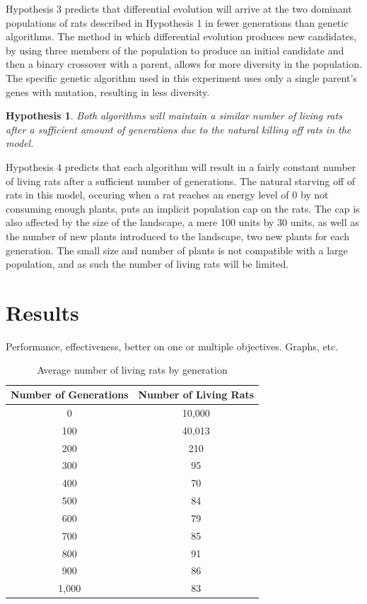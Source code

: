 \documentclass{sig-alternate}
\newtheorem{hyp}{Hypothesis}
\begin{document}
Hypothesis 3 predicts that differential evolution will arrive at the two dominant populations of rats described in Hypothesis 1 in fewer generations than genetic algorithms.  The method in which differential evolution produces new candidates, by using three members of the population to produce an initial candidate and then a binary crossover with a parent, allows for more diversity in the population.  The specific genetic algorithm used in this experiment uses only a single parent's genes with mutation, resulting in less diversity.

\begin{hyp}
\begin{minipage}[t]{2.2 in}
Both algorithms will maintain a similar number of living rats after a sufficient amount of generations due to the natural killing off rats in the model.
\end{minipage}
\end{hyp}

Hypothesis 4 predicts that each algorithm will result in a fairly constant number of living rats after a sufficient number of generations.  The natural starving off of rats in this model, occuring when a rat reaches an energy level of 0 by not consuming enough plants, puts an implicit population cap on the rats.  The cap is also affected by the size of the landscape, a mere 100 units by 30 units, as well as the number of new plants introduced to the landscape, two new plants for each generation.\cite{LOL}  The small size and number of plants is not compatible with a large population, and as such the number of living rats will be limited.

\section{Results}
Performance, effectiveness, better on one or multiple
objectives.  Graphs, etc.

\begin{table}
\centering
\caption{Average number of living rats by generation}
\begin{tabular}{c|c}
Number of Generations & Number of Living Rats \\
\hline
0 & 10,000 \\
100 & 40,013 \\
200 & 210 \\
300 & 95 \\
400 & 70 \\
500 & 84 \\
600 & 79 \\
700 & 85 \\
800 & 91 \\
900 & 86 \\
1,000 & 83 
\end{tabular}
\end{table}
\end{document}
